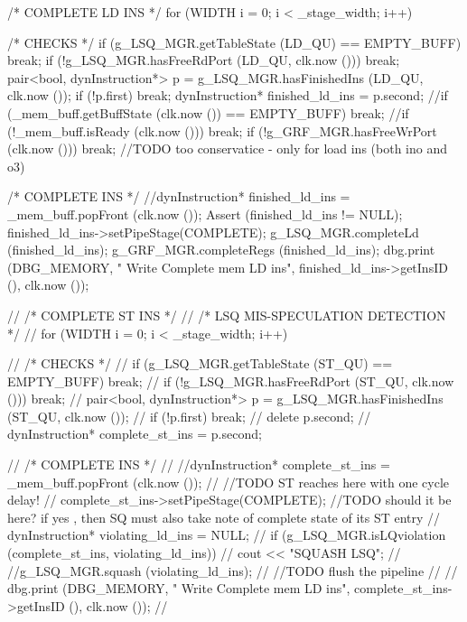 \begin{DoxyCode}
                                          {

    /* COMPLETE LD INS */
    for (WIDTH i = 0; i < _stage_width; i++) {
        /* CHECKS */
        if (g_LSQ_MGR.getTableState (LD_QU) == EMPTY_BUFF) break;
        if (!g_LSQ_MGR.hasFreeRdPort (LD_QU, clk.now ())) break;
        pair<bool, dynInstruction*> p = g_LSQ_MGR.hasFinishedIns (LD_QU, clk.now 
      ());
        if (!p.first) break;
        dynInstruction* finished_ld_ins = p.second;
        //if (_mem_buff.getBuffState (clk.now ()) == EMPTY_BUFF) break;
        //if (!_mem_buff.isReady (clk.now ())) break;
        if (!g_GRF_MGR.hasFreeWrPort (clk.now ())) break; //TODO too conservatice
       - only for load ins (both ino and o3)

        /* COMPLETE INS */
        //dynInstruction* finished_ld_ins = _mem_buff.popFront (clk.now ());
        Assert (finished_ld_ins != NULL);
        finished_ld_ins->setPipeStage(COMPLETE);
        g_LSQ_MGR.completeLd (finished_ld_ins);
        g_GRF_MGR.completeRegs (finished_ld_ins);
        dbg.print (DBG_MEMORY, "%
      Write Complete mem LD ins", finished_ld_ins->getInsID (), clk.now ());
    }

//  /* COMPLETE ST INS */
//  /* LSQ MIS-SPECULATION DETECTION */
//  for (WIDTH i = 0; i < _stage_width; i++) {
//      /* CHECKS */
//      if (g_LSQ_MGR.getTableState (ST_QU) == EMPTY_BUFF) break;
//      if (!g_LSQ_MGR.hasFreeRdPort (ST_QU, clk.now ())) break;
//      pair<bool, dynInstruction*> p = g_LSQ_MGR.hasFinishedIns (ST_QU, clk.now 
      ());
//      if (!p.first) break;
//      delete p.second;
//      dynInstruction* complete_st_ins = p.second;

//      /* COMPLETE INS */
//      //dynInstruction* complete_st_ins = _mem_buff.popFront (clk.now ());
//      //TODO ST reaches here with one cycle delay!
//      complete_st_ins->setPipeStage(COMPLETE); //TODO should it be here? if yes
      , then SQ must also take note of complete state of its ST entry
//      dynInstruction* violating_ld_ins = NULL;
//      if (g_LSQ_MGR.isLQviolation (complete_st_ins, violating_ld_ins)) {
//          cout << "SQUASH LSQ\n";
//          //g_LSQ_MGR.squash (violating_ld_ins);
//          //TODO flush the pipeline
//      }
//      dbg.print (DBG_MEMORY, "%
      Write Complete mem LD ins", complete_st_ins->getInsID (), clk.now ());
//  }
}
\end{DoxyCode}


